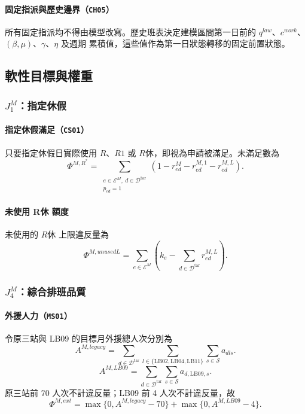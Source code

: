 \documentclass[a4paper,12pt]{article}
\begin{document}
\paragraph{固定指派與歷史邊界（\texttt{CH05}）}
所有固定指派均不得由模型改寫。歷史班表決定建模區間第一日前的
\(q^{law}\)、\(c^{work}\)、\((\beta,\mu)\)、\(\gamma\)、\(\eta\) 及週期
累積值，這些值作為第一日狀態轉移的固定前置狀態。

\subsection{軟性目標與權重}

\subsubsection{\texorpdfstring{$J^M_1$}{J1}：指定休假}

\paragraph{指定休假滿足（\texttt{CS01}）}
只要指定休假日實際使用 \(R\)、\(R1\) 或 \(R休\)，即視為申請被滿足。未滿足數為
\[
  \Phi^{M,R^*}
  =
  \sum_{\substack{e\in\mathcal{E}^{M},\ d\in\mathcal{D}^{\mathrm{tar}}\\p_{ed}=1}}
  \left(1-r^{M}_{ed}-r^{M,1}_{ed}-r^{M,L}_{ed}\right).
\]

\paragraph{未使用 R休 額度}
未使用的 \(R休\) 上限違反量為
\[
  \Phi^{M,unusedL}
  =\sum_{e\in\mathcal{E}^{M}}
  \left(k_e-\sum_{d\in\mathcal{D}^{\mathrm{tar}}}r^{M,L}_{ed}\right).
\]

\subsubsection{\texorpdfstring{$J^M_4$}{J4}：綜合排班品質}

\paragraph{外援人力（\texttt{MS01}）}
令原三站與 LB09 的目標月外援總人次分別為
\[
  A^{M,legacy}
  =
  \sum_{d\in\mathcal{D}^{\mathrm{tar}}}
  \sum_{l\in\{\mathrm{LB02},\mathrm{LB04},\mathrm{LB11}\}}
  \sum_{s\in\mathcal{S}}a_{dls}.
\]
\[
  A^{M,LB09}
  =
  \sum_{d\in\mathcal{D}^{\mathrm{tar}}}
  \sum_{s\in\mathcal{S}}a_{d,\mathrm{LB09},s}.
\]
原三站前 70 人次不計違反量；LB09 前 4 人次不計違反量，故
\[
  \Phi^{M,ext}=\max\{0,A^{M,legacy}-70\}+\max\{0,A^{M,LB09}-4\}.
\]
\end{document}
